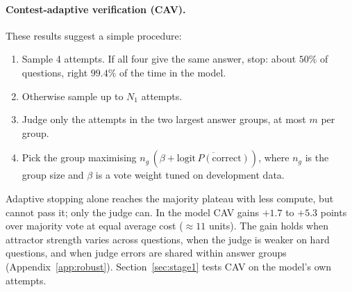 \paragraph{Contest-adaptive verification (CAV).}
These results suggest a simple procedure:
\begin{enumerate}
\item Sample 4 attempts. If all four give the same answer, stop: about $50\%$ of questions, right $99.4\%$ of the
  time in the model.
\item Otherwise sample up to $N_1$ attempts.
\item Judge only the attempts in the two largest answer groups, at most $m$ per group.
\item Pick the group maximising $n_g\,(\beta+\overline{\mathrm{logit}\,P(\text{correct})})$, where $n_g$ is the group
  size and $\beta$ is a vote weight tuned on development data.
\end{enumerate}
Adaptive stopping alone \citep{aggarwal2023adaptive} reaches the majority plateau with less compute, but cannot pass
it; only the judge can. In the model CAV gains $+1.7$ to $+5.3$ points over majority vote at equal average cost
($\approx11$ units). The gain holds when attractor strength varies across questions, when the judge is weaker on hard
questions, and when judge errors are shared within answer groups (Appendix~\ref{app:robust}).
Section~\ref{sec:stage1} tests CAV on the model's own attempts.
